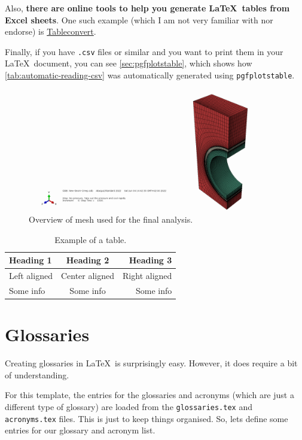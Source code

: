 \begin{description}
	Also, \textbf{there are online tools to help you generate \LaTeX\ tables from Excel sheets}. One such example (which I am not very familiar with nor endorse) is \href{https://tableconvert.com/excel-to-latex}{Tableconvert}.

	Finally, if you have \texttt{.csv} files or similar and you want to print them in your \LaTeX\ document, you can see \cref{sec:pgfplotstable}, which shows how \cref{tab:automatic-reading-csv} was automatically generated using \verb|pgfplotstable|.
\end{description}

\begin{figure}[h]
	\centering %
	\includegraphics[keepaspectratio, trim = 1050 12 150 30, clip, width=0.5\linewidth, height=0.3\textheight]{Images/monoblock-material-overview-mesh.png}
	\caption[Overview of  mesh used for the final analysis.]{Overview of  mesh used for the final analysis.}
	\label{fig:monoblock-overview-mesh}
\end{figure}

\begin{table}[h]
	\centering %
	\begin{tabular}{lcr}
	  \toprule
	  Heading 1 & Heading 2 & Heading 3 \\
	  \midrule
	  Left aligned & Center aligned & Right aligned \\
	  \cmidrule{2-3} %
	  Some info & Some info & Some info \\
	  \bottomrule
	\end{tabular}
	\caption{Example of a table.}
	\label{tab:example-table}
\end{table}

\section{Glossaries}\label{sec:glossaries}

Creating glossaries in \LaTeX\ is surprisingly easy. However, it does require a bit of understanding.

For this template, the entries for the glossaries and acronyms (which are just a different type of glossary) are loaded from the \texttt{glossaries.tex} and \texttt{acronyms.tex} files. This is just to keep things organised. So, lets define some entries for our glossary and acronym list.

